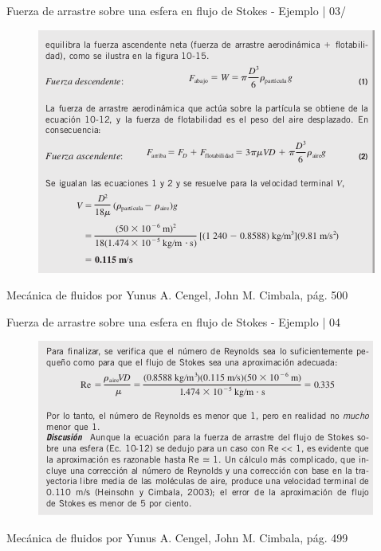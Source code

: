 \begin{frame}{Fuerza de arrastre sobre una esfera en flujo de Stokes - Ejemplo | 03/}
\justifying
\begin{figure}[H]
\centering
\includegraphics[scale=0.55]{Section_Files/S3-imagenes-Jhon/0032-02.png}
\end{figure}
{\tiny Mecánica de fluidos por Yunus A. Cengel, John M. Cimbala, pág. 500}
\end{frame}

\begin{frame}{Fuerza de arrastre sobre una esfera en flujo de Stokes - Ejemplo | 04}
\begin{figure}[H]
\centering
\includegraphics[scale=0.55]{Section_Files/S3-imagenes-Jhon/0032-03.png}
\end{figure}
{\tiny Mecánica de fluidos por Yunus A. Cengel, John M. Cimbala, pág. 499}
\end{frame}

